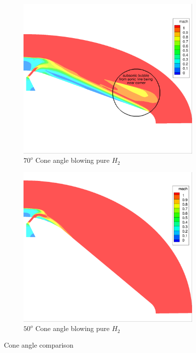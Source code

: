 \begin{figure}[h]
  \centering
  \begin{subfigure}[b]{0.45\textwidth}
    \centering
    \includegraphics[width=\textwidth]{figures/sonic-bubble/sonic_bubble.png}
    \caption{$70^o$ Cone angle blowing pure $H_2$}
    \label{fig:70-deg-cone}
  \end{subfigure}
  \begin{subfigure}[b]{0.45\textwidth}
    \centering
    \includegraphics[width=\textwidth]{figures/sonic-bubble/no_bubble.png}
    \caption{$50^o$ Cone angle blowing pure $H_2$}
    \label{fig:50-deg-cone}
  \end{subfigure}
  \caption{Cone angle comparison}
  \label{fig:cone-angle-comp}
\end{figure}
